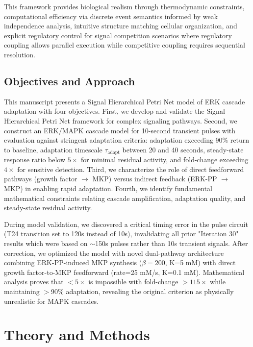 \documentclass[twocolumn,11pt]{article}
\newcommand{\shpn}{Signal Hierarchical Petri Net}
\newcommand{\erk}{ERK}
\newcommand{\mkp}{MKP}
\newcommand{\mapk}{MAPK}
\newcommand{\srr}{\text{SRR}}
\begin{document}
This framework provides biological realism through thermodynamic constraints, computational efficiency via discrete event semantics informed by weak independence analysis, intuitive structure matching cellular organization, and explicit regulatory control for signal competition scenarios where regulatory coupling allows parallel execution while competitive coupling requires sequential resolution.

\subsection{Objectives and Approach}

This manuscript presents a \shpn{} model of \erk{} cascade adaptation with four objectives. First, we develop and validate the \shpn{} framework for complex signaling pathways. Second, we construct an \erk{}/\mapk{} cascade model for 10-second transient pulses with evaluation against stringent adaptation criteria: adaptation exceeding 90\% return to baseline, adaptation timescale $\tau_{\text{adapt}}$ between 20 and 40 seconds, steady-state response ratio \srr{} below $5\times$ for minimal residual activity, and fold-change exceeding $4\times$ for sensitive detection. Third, we characterize the role of direct feedforward pathways (growth factor $\to$ \mkp{}) versus indirect feedback (\erk{}-PP $\to$ \mkp{}) in enabling rapid adaptation. Fourth, we identify fundamental mathematical constraints relating cascade amplification, adaptation quality, and steady-state residual activity.

During model validation, we discovered a critical timing error in the pulse circuit (T24 transition set to 120s instead of 10s), invalidating all prior "Iteration 30" results which were based on $\sim$150s pulses rather than 10s transient signals. After correction, we optimized the model with novel dual-pathway architecture combining \erk{}-PP-induced \mkp{} synthesis ($\beta=200$, K=5 mM) with direct growth factor-to-\mkp{} feedforward (rate=25 mM/s, K=0.1 mM). Mathematical analysis proves that \srr{} $<5\times$ is impossible with fold-change $>115\times$ while maintaining $>90\%$ adaptation, revealing the original criterion as physically unrealistic for MAPK cascades.

\section{Theory and Methods}
\end{document}
